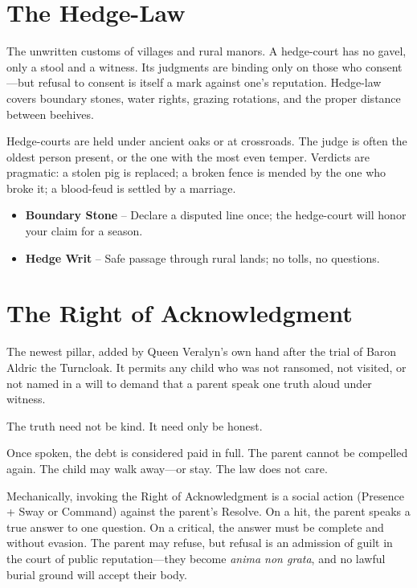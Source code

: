 \documentclass[11pt,twoside]{book}
\newenvironment{sidebar}[1][]
{\begin{tcolorbox}[colback=agedpaper,colframe=royalblue,boxrule=0.5pt,arc=2mm,title={\scshape\small #1},fonttitle=\bfseries]}
{\end{tcolorbox}}
\begin{document}
\section{The Hedge-Law}

The unwritten customs of villages and rural manors. A hedge-court has no gavel, only a stool and a witness. Its judgments are binding only on those who consent---but refusal to consent is itself a mark against one's reputation. Hedge-law covers boundary stones, water rights, grazing rotations, and the proper distance between beehives.

Hedge-courts are held under ancient oaks or at crossroads. The judge is often the oldest person present, or the one with the most even temper. Verdicts are pragmatic: a stolen pig is replaced; a broken fence is mended by the one who broke it; a blood-feud is settled by a marriage.

\begin{sidebar}[Strings (Hedge-Law)]
\begin{itemize}
    \item \textbf{Boundary Stone} -- Declare a disputed line once; the hedge-court will honor your claim for a season.
    \item \textbf{Hedge Writ} -- Safe passage through rural lands; no tolls, no questions.
\end{itemize}
\end{sidebar}

\section{The Right of Acknowledgment}

The newest pillar, added by Queen Veralyn's own hand after the trial of Baron Aldric the Turncloak. It permits any child who was not ransomed, not visited, or not named in a will to demand that a parent speak one truth aloud under witness.

The truth need not be kind. It need only be honest.

Once spoken, the debt is considered paid in full. The parent cannot be compelled again. The child may walk away---or stay. The law does not care.

Mechanically, invoking the Right of Acknowledgment is a social action (Presence + Sway or Command) against the parent's Resolve. On a hit, the parent speaks a true answer to one question. On a critical, the answer must be complete and without evasion. The parent may refuse, but refusal is an admission of guilt in the court of public reputation---they become \textit{anima non grata}, and no lawful burial ground will accept their body.
\end{document}
